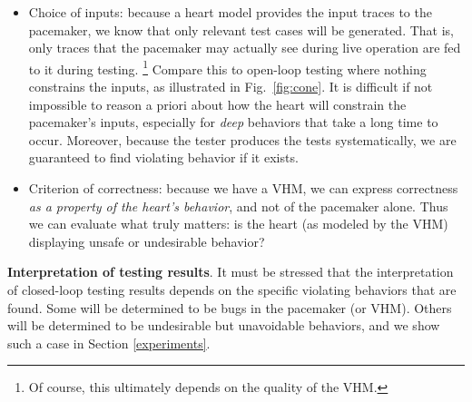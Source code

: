 \begin{itemize}
	\item Choice of inputs: because a heart model provides the input traces to the pacemaker, we know that only relevant test cases will be generated. 
	That is, only traces that the pacemaker may actually see during live operation are fed to it during testing. 
	\footnote{Of course, this ultimately depends on the quality of the VHM.}
	Compare this to open-loop testing where nothing constrains the inputs, as illustrated in Fig.~\ref{fig:cone}.
	It is difficult if not impossible to reason a priori about how the heart will constrain the pacemaker's inputs, especially for \emph{deep} behaviors that take a long time to occur.	
	Moreover, because the tester produces the tests systematically, we are guaranteed to find violating behavior if it exists.
	\item Criterion of correctness: because we have a VHM, we can express correctness \emph{as a property of the heart's behavior}, and not of the pacemaker alone. 
	Thus we can evaluate what truly matters: is the heart (as modeled by the VHM) displaying unsafe or undesirable behavior?
\end{itemize}


\textbf{Interpretation of testing results}.
It must be stressed that the interpretation of closed-loop testing results depends on the specific violating behaviors that are found.
Some will be determined to be bugs in the pacemaker (or VHM). 
Others will be determined to be undesirable but unavoidable behaviors, and we show such a case in Section \ref{experiments}.

